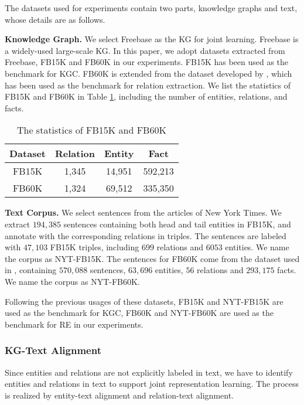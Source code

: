\documentclass[letterpaper]{article} %
\begin{document}
The datasets used for experiments contain two parts, knowledge graphs and text, whose details are as follows.

\textbf{Knowledge Graph.} We select Freebase \cite{bollacker2008freebase} as the KG for joint learning. Freebase is a widely-used large-scale KG. In this paper, we adopt datasets extracted from Freebase, FB15K and FB60K in our experiments. FB15K has been used as the benchmark for KGC. FB60K is extended from the dataset developed by \cite{riedel2010modeling}, which has been used as the benchmark for relation extraction. We list the statistics of FB15K and FB60K in Table \ref{tab:statistics-of-FB15K}, including the number of entities, relations, and facts.

\begin{table}[htb]
\centering
\small
\begin{tabular}{c|ccc}
\toprule
\textbf{Dataset} & \textbf{Relation} & \textbf{Entity} & \textbf{Fact} \\ 
\midrule
FB15K   & 1,345           & 14,951            & 592,213 \\ 
FB60K   & 1,324           & 69,512            & 335,350 \\ 
\bottomrule
\end{tabular}
\caption{The statistics of FB15K and FB60K}
\label{tab:statistics-of-FB15K}
\end{table}

\textbf{Text Corpus.} We select sentences from the articles of New York Times. We extract $194,385$ sentences containing both head and tail entities in FB15K, and annotate with the corresponding relations in triples. The sentences are labeled with $47,103$ FB15K triples, including $699$ relations and $6053$ entities. We name the corpus as NYT-FB15K. The sentences for FB60K come from the dataset used in \cite{riedel2010modeling}, containing $570,088$ sentences, $63,696$ entities, $56$ relations and $293,175$ facts. We name the corpus as NYT-FB60K.
 
Following the previous usages of these datasets, FB15K and NYT-FB15K are used as the benchmark for KGC, FB60K and NYT-FB60K are used as the benchmark for RE in our experiments.


\subsubsection{KG-Text Alignment}
\label{sec:alignment}

Since entities and relations are not explicitly labeled in text, we have to identify entities and relations in text to support joint representation learning. The process is realized by entity-text alignment and relation-text alignment.
\end{document}
